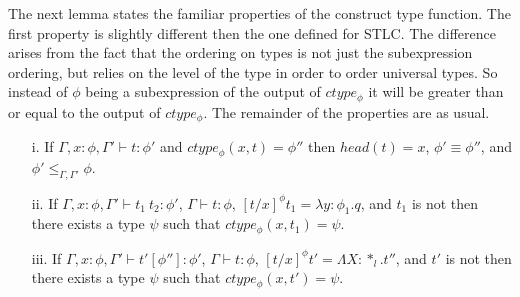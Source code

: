 \noindent The next lemma states the familiar properties of the
construct type function.  The first property is slightly different
then the one defined for STLC.  The difference arises from the fact
that the ordering on types is not just the subexpression ordering, but
relies on the level of the type in order to order universal types.  So
instead of $\phi$ being a subexpression of the output of $ctype_\phi$
it will be greater than or equal to the output of $ctype_\phi$.  The
remainder of the properties are as usual.

\begin{lemma}
  \label{lemma:ctype_props_ssf}
  \begin{itemize}
  \item[]
  \item[i.] If $\Gamma,x:\phi,\Gamma' \vdash t:\phi'$ and $ctype_\phi(x,t) = \phi''$ then 
    $head(t) = x$, $\phi' \equiv \phi''$, and $\phi' \leq_{\Gamma,\Gamma'} \phi$.

  \item[ii.] If $\Gamma,x:\phi,\Gamma' \vdash t_1\ t_2:\phi'$, $\Gamma \vdash t:\phi$,
    $[t/x]^\phi t_1 = \lambda y:\phi_1.q$, and $t_1$ is not then there exists a type
    $\psi$ such that $ctype_\phi(x,t_1) = \psi$.

  \item[iii.] If $\Gamma,x:\phi,\Gamma' \vdash t'[\phi'']:\phi'$, $\Gamma \vdash t:\phi$,
    $[t/x]^\phi t' = \Lambda X:*_l.t''$, and $t'$ is not then there exists a type
    $\psi$ such that $ctype_\phi(x,t') = \psi$.
  \end{itemize}
\end{lemma}
